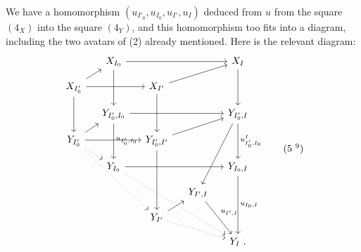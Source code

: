 We have a homomorphism $(u_{I'_0}, u_{I_0}, u_{I'}, u_I)$ deduced from $u$ from the square $(4_X)$ into the square $(4_Y)$, %
and this homomorphism too fits into a diagram, including the two avatars of (2) already mentioned. Here is the relevant diagram: %
\[
\begin{tikzcd}[column sep=small, row sep=small]
 & X_{I_0} \arrow[rrr] \arrow[dd] & & & X_I \arrow[dd] \\
X_{I'_0} \arrow[ur] \arrow[rr] \arrow[dd] & & X_{I'} \arrow[urr] \arrow[dd] & & \\
 & Y_{I'_0,I_0} \arrow[rrr] \arrow[dd, "u_{I'_0,I_0}"] & & & Y_{I'_0,I} \arrow[dd, "u^I_{I'_0,I_0}"] \arrow[dddl] \\
Y_{I'_0} \arrow[ur] \arrow[rr] \arrow[dr, dotted] \arrow[dddrr, dotted] & & Y_{I'_0,I'} \arrow[urr] \arrow[ddd] & & \\
 & Y_{I_0} \arrow[rrr] \arrow[dddrrr, dotted] & & & Y_{I_0,I} \arrow[ddd, "u_{I_0,I}"] \\
 & & & Y_{I',I} \arrow[ddr, "u_{I',I}"] & \\
 & & Y_{I'} \arrow[ur] \arrow[drr, dotted] & & \\
 & & & & Y_I\ .
\end{tikzcd}
\tag*{(5~\footnotemark[9])}
\]

